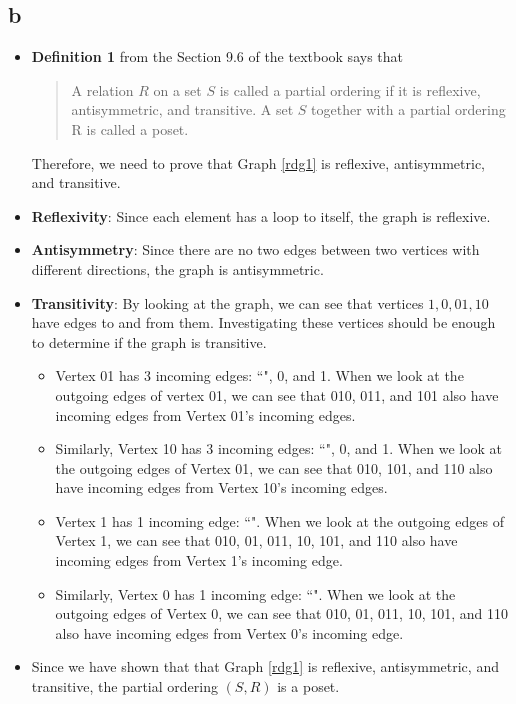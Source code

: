 \documentclass[11pt]{article}
\begin{document}
\subsection*{b}
\begin{itemize}
    \item  \textbf{Definition 1} from the Section 9.6 of the textbook says that 
    \begin{quote}
        A relation $R$ on a set $S$ is called a partial ordering if it is reflexive, antisymmetric, and transitive. A set $S$ together with a partial ordering R is called a poset.
    \end{quote}
    Therefore, we need to prove that Graph \ref{rdg1} is reflexive, antisymmetric, and transitive.
    \item \textbf{Reflexivity}: Since each element has a loop to itself, the graph is reflexive.
    \item \textbf{Antisymmetry}: Since there are no two edges between two vertices with different directions, the graph is antisymmetric.
    \item \textbf{Transitivity}: By looking at the graph, we can see that vertices $1,0,01,10$ have edges to and from them. Investigating these vertices should be enough to determine if the graph is transitive.
    \begin{itemize}
        \item Vertex 01 has 3 incoming edges: ``", 0, and 1. When we look at the outgoing edges of vertex 01, we can see that 010, 011, and 101 also have incoming edges from Vertex 01's incoming edges. 
        \item Similarly, Vertex 10 has 3 incoming edges: ``", 0, and 1. When we look at the outgoing edges of Vertex 01, we can see that 010, 101, and 110 also have incoming edges from Vertex 10's incoming edges. 
        \item Vertex 1 has 1 incoming edge: ``". When we look at the outgoing edges of Vertex 1, we can see that 010, 01, 011, 10, 101, and 110 also have incoming edges from Vertex 1's incoming edge. 
        \item Similarly, Vertex 0 has 1 incoming edge: ``". When we look at the outgoing edges of Vertex 0, we can see that 010, 01, 011, 10, 101, and 110 also have incoming edges from Vertex 0's incoming edge. 
    \end{itemize}
    \item Since we have shown that that Graph \ref{rdg1} is reflexive, antisymmetric, and transitive, the partial ordering $(S,R)$ is a poset.
\end{itemize}
\end{document}
